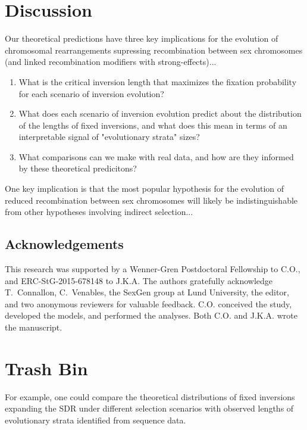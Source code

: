 \documentclass{article}
\begin{document}
\section*{Discussion} \label{sec:Discussion}

Our theoretical predictions have three key implications for the evolution of chromosomal rearrangements supressing recombination between sex chromosomes (and linked recombination modifiers with strong-effects)...

\begin{enumerate}
	\item What is the critical inversion length that maximizes the fixation probability for each scenario of inversion evolution? 
	\item What does each scenario of inversion evolution predict about the distribution of the lengths of fixed inversions, and what does this mean in terms of an interpretable signal of "evolutionary strata" sizes?
	\item What comparisons can we make with real data, and how are they informed by these theoretical predicitons?
\end{enumerate}


One key implication is that the most popular hypothesis for the evolution of reduced recombination between sex chromosomes will likely be indistinguishable from other hypotheses involving indirect selection...




\subsection*{Acknowledgements}
This research was supported by a Wenner-Gren Postdoctoral Fellowship to C.O., and ERC-StG-2015-678148 to J.K.A. The authors gratefully acknowledge T.~Connallon, C.~Venables, the SexGen group at Lund University, the editor, and two anonymous reviewers for valuable feedback. C.O. conceived the study, developed the models, and performed the analyses. Both C.O. and J.K.A. wrote the manuscript.

\section*{Trash Bin}

For example, one could compare the theoretical distributions of fixed inversions expanding the SDR under different selection scenarios with observed lengths of evolutionary strata identified from sequence data.
	 
\end{document}

